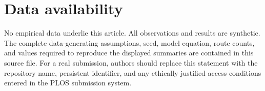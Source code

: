 \section*{Data availability}
No empirical data underlie this article. All observations and results are synthetic. The complete data-generating assumptions, seed, model equation, route counts, and values required to reproduce the displayed summaries are contained in this source file. For a real submission, authors should replace this statement with the repository name, persistent identifier, and any ethically justified access conditions entered in the PLOS submission system.
